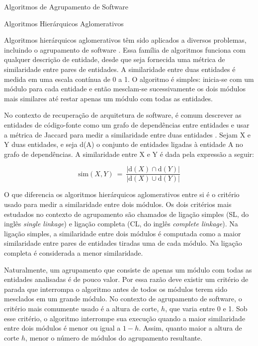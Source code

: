 \begin{section}{Algoritmos de Agrupamento de Software}
\begin{subsection}{Algoritmos Hierárquicos Aglomerativos}

Algoritmos hierárquicos aglomerativos têm sido aplicados a diversos problemas, incluindo o agrupamento de software \cite{Anquetil1999,Maqbool2007}. Essa família de algoritmos funciona com qualquer descrição de entidade, desde que seja fornecida uma métrica de similaridade entre pares de entidades. A similaridade entre duas entidades é medida em uma escala contínua de 0 a 1. O algoritmo é simples: inicia-se com um módulo para cada entidade e então mesclam-se sucessivamente os dois módulos mais similares até restar apenas um módulo com todas as entidades.

No contexto de recuperação de arquitetura de software, é comum descrever as entidades de código-fonte como um grafo de dependências entre entidades e usar a métrica de Jaccard para medir a similaridade entre duas entidades \cite{Anquetil1999}. Sejam X e Y duas entidades, e seja d(A) o conjunto de entidades ligadas à entidade A no grafo de dependências. A similaridade entre X e Y é dada pela expressão a seguir:

$$
\mathrm{sim}(X, Y) ~=~ \frac{|\mathrm{d}(X) \cap \mathrm{d}(Y)|}{|\mathrm{d}(X) \cup \mathrm{d}(Y)|}
$$

O que diferencia os algoritmos hierárquicos aglomerativos entre si é o critério usado para medir a similaridade entre dois módulos. Os dois critérios mais estudados no contexto de agrupamento são chamados de ligação simples (SL, do inglês \emph{single linkage}) e ligação completa (CL, do inglês \emph{complete linkage}). Na ligação simples, a similaridade entre dois módulos é computada como a maior similaridade entre pares de entidades tiradas uma de cada módulo. Na ligação completa é considerada a menor similaridade.

Naturalmente, um agrupamento que consiste de apenas um módulo com todas as entidades analisadas é de pouco valor. Por essa razão deve existir um critério de parada que interrompa o algoritmo antes de todos os módulos terem sido mesclados em um grande módulo. No contexto de agrupamento de software, o critério mais comumente usado é a altura de corte, $h$, que varia entre 0 e 1. Sob esse critério, o algoritmo interrompe sua execução quando a maior similaridade entre dois módulos é menor ou igual a $1 - h$. Assim, quanto maior a altura de corte $h$, menor o número de módulos do agrupamento resultante.
	
\end{subsection}


\end{section}
